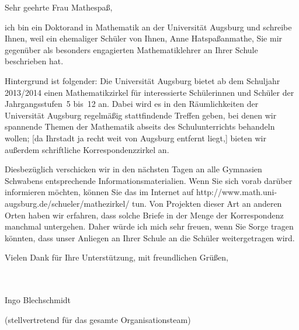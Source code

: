 \documentclass{zirkelbrief}
\begin{document}
\renewcommand{\anschrift}{%
      Holbein-Gymnasium Augsburg \\
      Fachbereich Mathematik \\
      Hallstraße 10 \\
      86150 Augsburg}
\renewcommand{\datum}{\today}
\renewcommand{\betreff}{Matheschülerzirkel der Universität Augsburg}
\renewcommand{\absender}{%
      \textbf{Ingo Blechschmidt} \\
      \ \\
      Lehrstuhl für Algebra und Zahlentheorie \\
      Universitätsstr. 14 \\
      86159 Augsburg \\
      \ \\
      Telefon \> +49 (0) 821 598 -- 5601 \\
      Telefax \> +49 (0) 821 598 -- 2090 \\
      \textsf{ingo.blechschmidt@math.uni-augsburg.de} \\}

\makeletterhead

Sehr geehrte Frau Mathespaß,

ich bin ein Doktorand in Mathematik an der Universität Augsburg und schreibe
Ihnen, weil ein ehemaliger Schüler von Ihnen, Anne Hatspaßanmathe, Sie mir
gegenüber als besonders engagierten Mathematiklehrer an Ihrer Schule
beschrieben hat.

Hintergrund ist folgender: Die Universität Augsburg bietet ab dem Schuljahr 2013/2014 einen
Mathematikzirkel für interessierte Schülerinnen und Schüler der
Jahrgangsstufen~5 bis~12 an. Dabei wird es in den Räumlichkeiten der
Universität Augsburg regelmäßig stattfindende Treffen geben, bei denen wir
spannende Themen der Mathematik abseits des Schulunterrichts behandeln wollen;
[da Ihrstadt ja recht weit von Augsburg entfernt liegt,] bieten wir außerdem
schriftliche Korrespondenzzirkel an.

Diesbezüglich verschicken wir in den nächsten Tagen an alle Gymnasien Schwabens
entsprechende Informationsmaterialien. Wenn Sie sich vorab darüber informieren
möchten, können Sie das im Internet auf
\textsf{http:/\!/www.math.uni-augsburg.de/schueler/mathezirkel/} tun. Von Projekten dieser Art an
anderen Orten haben wir erfahren, dass solche Briefe in der Menge der
Korrespondenz manchmal untergehen. Daher würde ich mich sehr freuen, wenn Sie
Sorge tragen könnten, dass unser Anliegen an Ihrer Schule an die Schüler
weitergetragen wird.

Vielen Dank für Ihre Unterstützung, mit freundlichen Grüßen,

\ \\
\ \\

\qquad Ingo Blechschmidt

\qquad (stellvertretend für das gesamte Organisationsteam)
\end{document}
